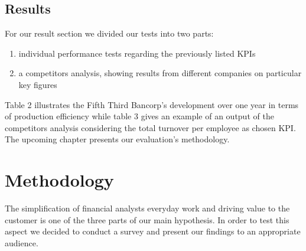 \documentclass[runningheads]{llncs}
\begin{document}
\subsection{Results}
For our result section we divided our tests into two parts:
\begin{enumerate}
\item individual performance tests regarding the previously listed KPIs
\item a competitors analysis, showing results from different companies on particular key figures
\end{enumerate}
Table 2 illustrates the Fifth Third Bancorp's development over one year in terms of production efficiency while table 3 gives an example of an output of the competitors analysis considering the total turnover per employee as chosen KPI. \\
The upcoming chapter presents our evaluation's methodology. 

\section{Methodology}\label{c4}
The simplification of financial analysts everyday work and driving value to the customer is one of the three parts of our main hypothesis. In order to test this aspect we decided to conduct a survey and present our findings to an appropriate audience.
\end{document}
